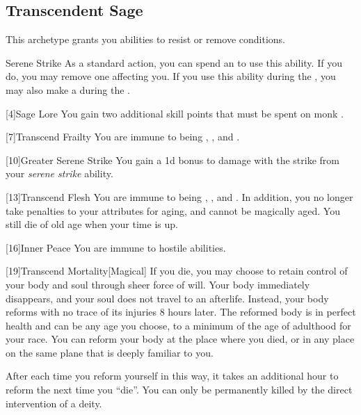     \subsection{Transcendent Sage}
        This archetype grants you abilities to resist or remove conditions.

        \begin{ability}{Serene Strike}
            As a standard action, you can spend an  to use this ability.
            If you do, you may remove one  affecting you.
            If you use this ability during the , you may also make a  during the .
        \end{ability}

        [4]{Sage Lore} You gain two additional skill points that must be spent on monk .

        [7]{Transcend Frailty}
        You are immune to being , , and .

        [10]{Greater Serene Strike} You gain a \plus1d bonus to damage with the strike from your \textit{serene strike} ability.

        [13]{Transcend Flesh}
        You are immune to being , , and .
        In addition, you no longer take penalties to your attributes for aging, and cannot be magically aged.
        You still die of old age when your time is up.

        [16]{Inner Peace}
        You are immune to hostile  abilities.

        [19]{Transcend Mortality}[Magical]
        If you die, you may choose to retain control of your body and soul through sheer force of will.
        Your body immediately disappears, and your soul does not travel to an afterlife.
        Instead, your body reforms with no trace of its injuries 8 hours later.
        The reformed body is in perfect health and can be any age you choose, to a minimum of the age of adulthood for your race.
        You can reform your body at the place where you died, or in any place on the same plane that is deeply familiar to you.

        After each time you reform yourself in this way, it takes an additional hour to reform the next time you ``die''.
        You can only be permanently killed by the direct intervention of a deity.

